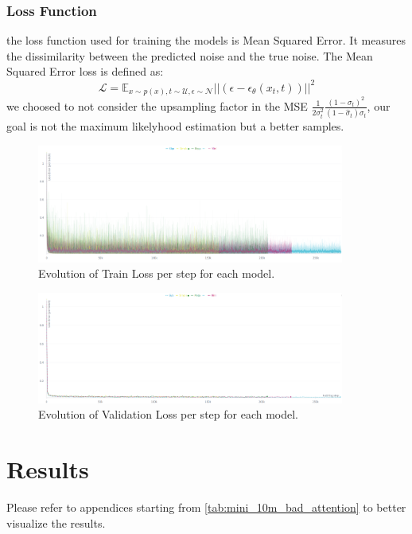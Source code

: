\documentclass[twocolumn,superscriptaddress,aps]{revtex4-1}
\begin{document}
\subsubsection{Loss Function}
the loss function used for training the models is Mean Squared Error. It measures the dissimilarity between the predicted noise and the true noise.
The Mean Squared Error loss is defined as:
\[
	\mathcal{L} = \mathbb{E}_{x \sim p(x), t \sim \mathcal{U}, \epsilon \sim \mathcal{N} } ||(\epsilon - \epsilon_\theta (x_t, t))||^2
\]
we choosed to not consider the upsampling factor in the MSE $\frac{1}{2\sigma_t^2} \frac{(1 - \sigma_t)^2}{(1 - \hat \sigma_t) \sigma_t}$, our goal is not the maximum likelyhood estimation but a better samples.

\begin{figure}[ht]
	\centering
	\includegraphics[width=0.9\textwidth]{figures/train----Screenshot from 2025-08-13 19-55-18.png}
	\caption{Evolution of Train Loss per step for each model.}
	\label{fig:train-losses}
\end{figure}

\begin{figure}[ht]
	\centering
	\includegraphics[width=0.9\textwidth]{figures/validation--Screenshot from 2025-08-13 19-56-31.png}
	\caption{Evolution of Validation Loss per step for each model.}
	\label{fig:val-losses}
\end{figure}

\section{Results}
Please refer to appendices starting from \ref{tab:mini_10m_bad_attention} to better visualize the results.
\end{document}
